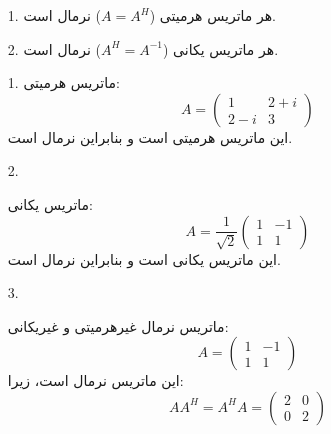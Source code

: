 \begin{nokteh}
	\begin{itemize}
		\item [1. ]
		هر ماتریس هرمیتی (\( A = A^H \)) نرمال است.
		\item[2.] 
		هر ماتریس یکانی (\( A^H = A^{-1} \)) نرمال است.
	\end{itemize}
\end{nokteh}
\begin{example}
	\begin{itemize}
		\item [1. ]
 ماتریس هرمیتی:
\[
A = \begin{pmatrix}
	1 & 2 + i \\
	2 - i & 3
\end{pmatrix}
\]
این ماتریس هرمیتی است و بنابراین نرمال است.
	\item [2. ]

ماتریس یکانی:
\[
A = \frac{1}{\sqrt{2}} \begin{pmatrix}
	1 & -1 \\
	1 & 1
\end{pmatrix}
\]
این ماتریس یکانی است و بنابراین نرمال است.
	\item [3. ]

 ماتریس نرمال غیرهرمیتی و غیریکانی:
\[
A = \begin{pmatrix}
	1 & -1 \\
	1 & 1
\end{pmatrix}
\]
این ماتریس نرمال است، زیرا:
\[
A A^H = A^H A = \begin{pmatrix}
	2 & 0 \\
	0 & 2
\end{pmatrix}
\]
	\end{itemize}
\end{example}

